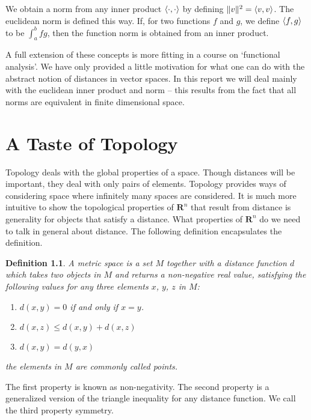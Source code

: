 \documentclass[12pt]{amsbook}
\theoremstyle{plain}
\newtheorem{definition}{Definition}
\theoremstyle{definition}
\DeclarePairedDelimiter{\inner}{\langle}{\rangle}
\begin{document}
We obtain a norm from any inner product $\inner{\cdot, \cdot}$ by defining $\|v\|^2 = \inner{v, v}$. The euclidean norm is defined this way. If, for two functions $f$ and $g$, we define $\inner{f,g}$ to be $\int_a^b fg$, then the function norm is obtained from an inner product.

A full extension of these concepts is more fitting in a course on `functional analysis'. We have only provided a little motivation for what one can do with the abstract notion of distances in vector spaces. In this report we will deal mainly with the euclidean inner product and norm -- this results from the fact that all norms are equivalent in finite dimensional space.





\chapter{A Taste of Topology}

Topology deals with the global properties of a space. Though distances will be important, they deal with only pairs of elements. Topology provides ways of considering space where infinitely many spaces are considered. It is much more intuitive to show the topological properties of $\mathbf{R}^n$ that result from distance is generality for objects that satisfy a distance. What properties of $\mathbf{R}^n$ do we need to talk in general about distance. The following definition encapsulates the definition.

\begin{definition}
  A metric space is a set $M$ together with a distance function $d$ which takes two objects in $M$ and returns a non-negative real value, satisfying the following values for any three elements $x$, $y$, $z$ in $M$:
  \begin{enumerate}
    \item $d(x,y) = 0$ if and only if $x = y$.
    \item $d(x,z) \leq d(x,y) + d(x,z)$
    \item $d(x,y) = d(y,x)$
  \end{enumerate}
  the elements in $M$ are commonly called points.
\end{definition}

The first property is known as non-negativity. The second property is a generalized version of the triangle inequality for any distance function. We call the third property symmetry.
\end{document}
